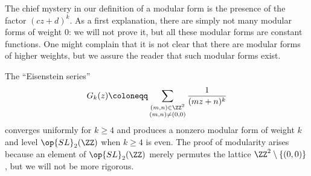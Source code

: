 \documentclass{amsart}
\begin{document}
The chief mystery in our definition of a modular form is the presence of the factor $(cz+d)^k$. As a first explanation, there are simply not many modular forms of weight $0$: we will not prove it, but all these modular forms are constant functions. One might complain that it is not clear that there are modular forms of higher weights, but we assure the reader that such modular forms exist.
\begin{example}
	The ``Eisenstein series''
	\[G_k(z)\coloneqq\sum_{\substack{(m,n)\in\ZZ^2\\(m,n)\ne(0,0)}}\frac1{(mz+n)^k}\]
	converges uniformly for $k\ge4$ and produces a nonzero modular form of weight $k$ and level $\op{SL}_2(\ZZ)$ when $k\ge4$ is even. The proof of modularity arises because an element of $\op{SL}_2(\ZZ)$ merely permutes the lattice $\ZZ^2\setminus\{(0,0)\}$, but we will not be more rigorous.
\end{example}
\end{document}
